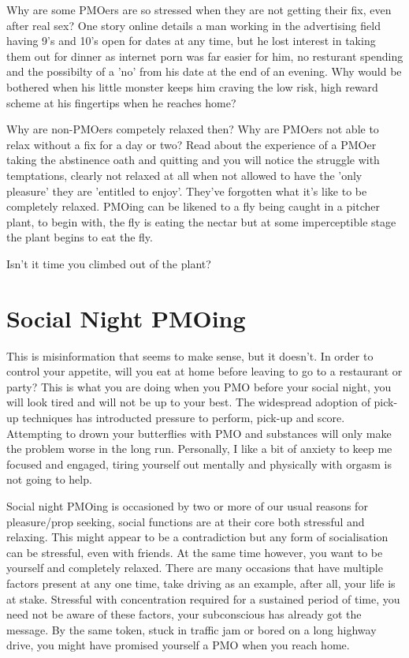 \documentclass[easypeasy.tex]{subfiles}
\begin{document}
Why are some PMOers are so stressed when they are not getting their fix, even after real sex? One story online details a man working in the advertising field having 9's and 10's open for dates at any time, but he lost interest in taking them out for dinner as internet porn was far easier for him, no resturant spending and the possibilty of a 'no' from his date at the end of an evening. Why would be bothered when his little monster keeps him craving the low risk, high reward scheme at his fingertips when he reaches home?

Why are non-PMOers competely relaxed then? Why are PMOers not able to relax without a fix for a day or two? Read about the experience of a PMOer taking the abstinence oath and quitting and you will notice the struggle with temptations, clearly not relaxed at all when not allowed to have the 'only pleasure' they are 'entitled to enjoy'. They've forgotten what it's like to be completely relaxed. PMOing can be likened to a fly being caught in a pitcher plant, to begin with, the fly is eating the nectar but at some imperceptible stage the plant begins to eat the fly.

Isn't it time you climbed out of the plant?

\section{Social Night PMOing}

This is misinformation that seems to make sense, but it doesn't. In order to control your appetite, will you eat at home before leaving to go to a restaurant or party? This is what you are doing when you PMO before your social night, you will look tired and will not be up to your best. The widespread adoption of pick-up techniques has introducted pressure to perform, pick-up and score. Attempting to drown your butterflies with PMO and substances will only make the problem worse in the long run. Personally, I like a bit of anxiety to keep me focused and engaged, tiring yourself out mentally and physically with orgasm is not going to help.

Social night PMOing is occasioned by two or more of our usual reasons for pleasure/prop seeking, social functions are at their core both stressful and relaxing. This might appear to be a contradiction but any form of socialisation can be stressful, even with friends. At the same time however, you want to be yourself and completely relaxed. There are many occasions that have multiple factors present at any one time, take driving as an example, after all, your life is at stake. Stressful with concentration required for a sustained period of time, you need not be aware of these factors, your subconscious has already got the message. By the same token, stuck in traffic jam or bored on a long highway drive, you might have promised yourself a PMO when you reach home.
\end{document}
